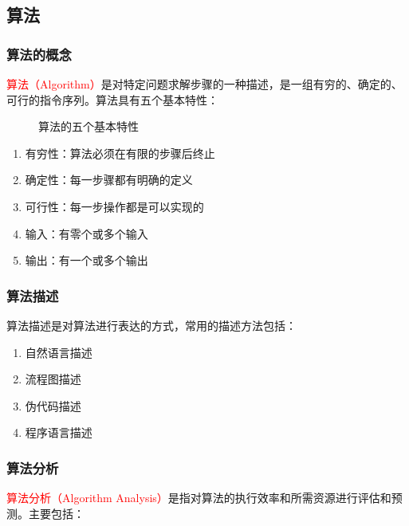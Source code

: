 \documentclass{../../note}
\begin{document}
\subsection{算法}

\subsubsection{算法的概念}
\textcolor{red}{算法（Algorithm）}是对特定问题求解步骤的一种描述，是一组有穷的、确定的、可行的指令序列。算法具有五个基本特性：

\begin{figure}[ht]
  \centering
  \caption{算法的五个基本特性}
\end{figure}

\begin{enumerate}
  \item 有穷性：算法必须在有限的步骤后终止
  \item 确定性：每一步骤都有明确的定义
  \item 可行性：每一步操作都是可以实现的
  \item 输入：有零个或多个输入
  \item 输出：有一个或多个输出
\end{enumerate}

\subsubsection{算法描述}
算法描述是对算法进行表达的方式，常用的描述方法包括：
\begin{enumerate}
  \item 自然语言描述
  \item 流程图描述
  \item 伪代码描述
  \item 程序语言描述
\end{enumerate}

\subsubsection{算法分析}
\textcolor{red}{算法分析（Algorithm Analysis）}是指对算法的执行效率和所需资源进行评估和预测。主要包括：
\end{document}
